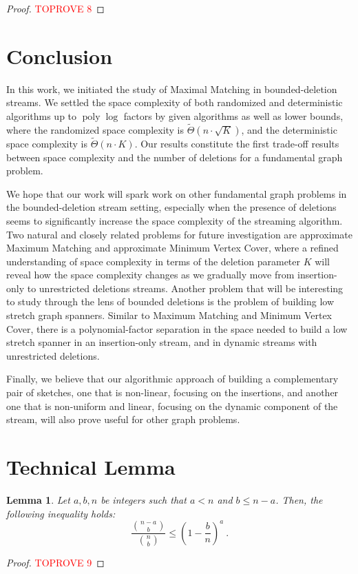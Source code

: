 \documentclass[11pt,a4paper]{article}
\newtheorem{lemma}{Lemma}
\DeclareMathOperator{\poly}{poly}
\begin{document}
\setcounter{theorem}{\value{thmsaved}} 



\begin{proof}\textcolor{red}{TOPROVE 8}\end{proof}



\section{Conclusion}\label{sec:conclusion}
In this work, we initiated the study of \textsf{Maximal Matching} in  bounded-deletion streams. We settled the space complexity of both randomized and deterministic algorithms up to $\poly \log$ factors by given algorithms as well as lower bounds, where the randomized space complexity is $\tilde{\Theta}(n \cdot \sqrt{K})$, and the deterministic space complexity is $\tilde{\Theta}(n \cdot K)$. Our results constitute the first trade-off results between space complexity and the number of deletions for a fundamental graph problem. 

We hope that our work will spark work on other fundamental graph problems in the bounded-deletion stream setting, especially when the presence of deletions seems to significantly increase the space complexity of the streaming algorithm. Two natural and closely related problems for future investigation are approximate \textsf{Maximum Matching} and approximate \textsf{Minimum Vertex Cover}, where a refined understanding of space complexity in terms of the deletion parameter $K$ will reveal how the space complexity changes as we gradually move from insertion-only to unrestricted deletions streams. Another problem that will be interesting to study through the lens of bounded deletions is the problem of building low stretch graph spanners. Similar to \textsf{Maximum Matching} and \textsf{Minimum Vertex Cover}, there is a polynomial-factor separation in the space needed to build a low stretch spanner in an insertion-only stream, and in dynamic streams with unrestricted deletions.




Finally, we believe that our algorithmic approach of building a complementary pair of sketches, one that is  non-linear, focusing on the insertions, and another one that is non-uniform and linear, focusing on the dynamic component of the stream, will also prove useful for other graph problems.







\appendix 

\section{Technical Lemma}
\begin{lemma}\label{lem:tech}
    Let $a,b,n$ be integers such that $a < n$ and $b \le n - a$. Then, the following inequality holds:
    $$\frac{ {n - a \choose b}}{{n \choose b}} \le \left(1 - \frac{b}{n} \right)^a \ .$$
\end{lemma}
\begin{proof}\textcolor{red}{TOPROVE 9}\end{proof}
\end{document}
